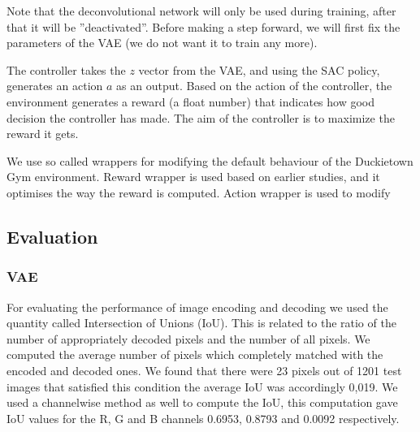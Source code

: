 \documentclass{article}
\begin{document}
Note that the deconvolutional network will only be used during training, after that it will be ''deactivated''. Before making a step forward, we will first fix the parameters of the VAE (we do not want it to train any more).

The controller takes the $z$ vector from the VAE, and using the SAC policy, generates an action $a$ as an output. Based on the action of the controller, the environment generates a reward (a float number) that indicates how good decision the controller has made. The aim of the controller is to maximize the reward it gets.

We use so called wrappers for modifying the default behaviour of the Duckietown Gym environment. Reward wrapper is used based on earlier studies, and it optimises the way the reward is computed. Action wrapper is used to modify 



\subsection{Evaluation}

\subsubsection{VAE}
For evaluating the performance of image encoding and decoding we used the quantity called Intersection of Unions (IoU). This is related to the ratio of the number of appropriately decoded pixels and the number of all pixels. We computed the average number of pixels which completely matched with the encoded and decoded ones. We found that there were 23 pixels out of 1201 test images that satisfied this condition the average IoU was accordingly 0,019. We used a channelwise method as well to compute the IoU, this computation gave IoU values for the R, G and B channels 0.6953, 0.8793 and 0.0092 respectively.
\end{document}

